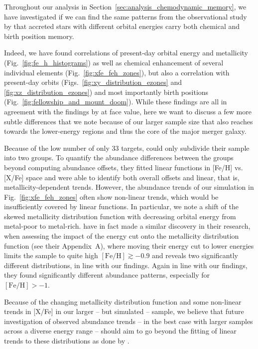 \documentclass[fleqn,usenatbib]{mnras}
\newcommand{\changed}[1]{{{#1}}}
\begin{document}
Throughout our analysis in Section~\ref{sec:analysis_chemodynamic_memory}, we have investigated if we can find the same patterns from the observational study by \citet{Skuladottir2025} that accreted stars with different orbit\changed{al} energies carry both chemical and birth position memory.

Indeed, we have found correlations of present-day orbit\changed{al} energy and metallicity (Fig.~\ref{fig:fe_h_histograms}) as well as chemical enhancement of several individual elements (Fig.~\ref{fig:xfe_feh_zones}), but also a correlation with present-day orbits (Figs.~\ref{fig:xy_distribution_ezones} and \ref{fig:xz_distribution_ezones}) and most importantly birth positions (Fig.~\ref{fig:fellowship_and_mount_doom}). While these findings are all in agreement with the findings by \citet{Skuladottir2025} at face value, here we want to discuss a few more subtle differences that we note because of our larger sample size that also reaches towards the lower-energy regions and thus the core of the major merger galaxy.

Because of the low number of only 33 targets, \citet{Skuladottir2025} could only subdivide their sample into two groups. To quantify the abundance differences between the groups beyond computing abundance offsets, they fitted linear functions in [Fe/H] vs. [X/Fe] space and were able to identify both overall offsets and linear, that is, metallicity-dependent trends. However, the abundance trends of our simulation in Fig.~\ref{fig:xfe_feh_zones} often show non-linear trends, which would be insufficiently covered by linear functions. In particular, we note a shift of the skewed metallicity distribution function with decreasing orbit\changed{al} energy from metal-poor to metal-rich. \citet{Skuladottir2025} have in fact made a similar discovery in their research, when assessing the impact of the energy cut onto the metallicity distribution function (see their Appendix~A), where moving their energy cut to lower energies limits the sample to quite high $\mathrm{[Fe/H]} \gtrsim -0.9$ and reveals two significantly different distributions, in line with our findings. Again in line with our findings, they found significantly different abundance patterns, especially for $\mathrm{[Fe/H]} > -1$.

Because of the changing metallicity distribution function and some non-linear trends in [X/Fe] in our larger -- but simulated -- sample, we believe that future investigation of observed abundance trends -- in the best case with larger samples across a diverse energy range -- should aim to go beyond the fitting of linear trends to these distributions as done by \citet{Skuladottir2025}.
\end{document}
